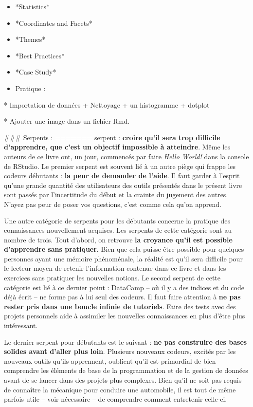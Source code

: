 \documentclass[
  letterpaper,
]{scrbook}
\begin{document}
\begin{itemize}
\item
  *Statistics*
\item
  *Coordinates and Facets*
\item
  *Themes*
\item
  *Best Practices*
\item
  *Case Study*
\item
  Pratique :
\end{itemize}

* Importation de données + Nettoyage + un histogramme + dotplot

* Ajouter une image dans un fichier Rmd.

\#\#\# Serpents :
=======
serpent : \textbf{croire qu'il sera trop difficile d'apprendre, que
c'est un objectif impossible à atteindre}. Même les auteurs de ce livre
ont, un jour, commencés par faire \emph{Hello World!} dans la console de
RStudio. Le premier serpent est souvent lié à un autre piège qui frappe
les codeurs débutants : \textbf{la peur de demander de l'aide}. Il faut
garder à l'esprit qu'une grande quantité des utilisateurs des outils
présentés dans le présent livre sont passés par l'incertitude du début
et la crainte du jugement des autres. N'ayez pas peur de poser vos
questions, c'est comme cela qu'on apprend.

Une autre catégorie de serpents pour les débutants concerne la pratique
des connaissances nouvellement acquises. Les serpents de cette catégorie
sont au nombre de trois. Tout d'abord, on retrouve \textbf{la croyance
qu'il est possible d'apprendre sans pratiquer}. Bien que cela puisse
être possible pour quelques personnes ayant une mémoire phénoménale, la
réalité est qu'il sera difficile pour le lecteur moyen de retenir
l'information contenue dans ce livre et dans les exercices sans
pratiquer les nouvelles notions. Le second serpent de cette catégorie
est lié à ce dernier point : DataCamp -- où il y a des indices et du
code déjà écrit -- ne forme pas à lui seul des codeurs. Il faut faire
attention à \textbf{ne pas rester pris dans une boucle infinie de
tutoriels}. Faire des tests avec des projets personnels aide à assimiler
les nouvelles connaissances en plus d'être plus intéressant.

Le dernier serpent pour débutants est le suivant : \textbf{ne pas
construire des bases solides avant d'aller plus loin}. Plusieurs
nouveaux codeurs, excités par les nouveaux outils qu'ils apprennent,
oublient qu'il est primordial de bien comprendre les éléments de base de
la programmation et de la gestion de données avant de se lancer dans des
projets plus complexes. Bien qu'il ne soit pas requis de connaître la
mécanique pour conduire une automobile, il est tout de même parfois
utile -- voir nécessaire -- de comprendre comment entretenir celle-ci.
\end{document}
